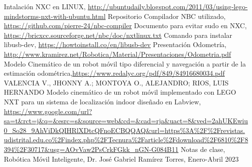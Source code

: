 \documentclass[oneside,onecolumn]{article}
\begin{document}

\begin{thebibliography}{2} %
  
 Intalación NXC en LINUX, \url{http://ubuntudaily.blogspot.com/2011/03/using-lego-mindstorms-nxt-with-ubuntu.html}
 Repositorio Compilador NBC utilizado, \url{https://github.com/pierre-24/nbc-compiler}
 Documento para evitar sudo en NXC, \url{https://bricxcc.sourceforge.net/nbc/doc/nxtlinux.txt}
 Comando para instalar libusb-dev, \url{https://howtoinstall.co/en/libusb-dev}
 Presentación Odometría, \url{http://www.kramirez.net/Robotica/Material/Presentaciones/Odometria.pdf}
 Modelo Cinemático de un robot móvil tipo diferencial y navegación a partir de la estimación odométrica,\url{https://www.redalyc.org/pdf/849/84916680034.pdf} VALENCIA V., JHONNY A.; MONTOYA O., ALEJANDRO; RIOS, LUIS HERNANDO
 Modelo cinemático de un robot móvil implementado con LEGO NXT para un sistema de localización indoor diseñado en Labview, \url{https://www.google.com/url?sa=t&rct=j&q=&esrc=s&source=web&cd=&cad=rja&uact=8&ved=2ahUKEwiu0_So28_9AhViDkQIHRlXDtcQFnoECBQQAQ&url=https%3A%2F%2Frevistas.udistrital.edu.co%2Findex.php%2FTecnura%2Farticle%2Fdownload%2F6810%2F8394%2F30717&usg=AOvVaw2PsCrkFGkk_nGN-G084B11}
 Notas de clase, Robótica Móvil Inteligente, Dr. José Gabriel Ramírez Torres, Enero-Abril 2023
\end{thebibliography}

\end{document}

